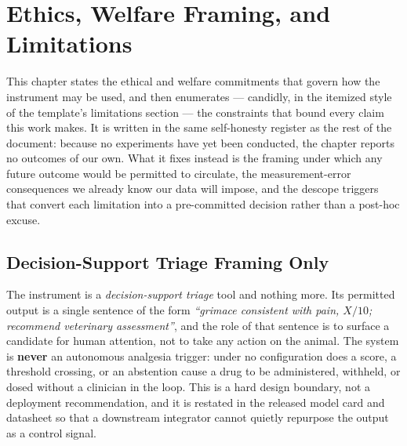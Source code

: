 
\chapter{Ethics, Welfare Framing, and Limitations}
\label{ch:ethics-welfare-limitations}

This chapter states the ethical and welfare commitments that govern how the
instrument may be used, and then enumerates --- candidly, in the itemized style
of the template's limitations section --- the constraints that bound every claim
this work makes. It is written in the same self-honesty register as the rest of
the document: because no experiments have yet been conducted, the chapter
reports no outcomes of our own. What it fixes instead is the framing under which
any future outcome would be permitted to circulate, the measurement-error
consequences we already know our data will impose, and the descope triggers that
convert each limitation into a pre-committed decision rather than a post-hoc
excuse.

\section{Decision-Support Triage Framing Only}
\label{sec:triage-framing}

The instrument is a \emph{decision-support triage} tool and nothing more. Its
permitted output is a single sentence of the form \emph{``grimace consistent
with pain, $X/10$; recommend veterinary assessment''}, and the role of that
sentence is to surface a candidate for human attention, not to take any action
on the animal. The system is \textbf{never} an autonomous analgesia trigger:
under no configuration does a score, a threshold crossing, or an abstention
cause a drug to be administered, withheld, or dosed without a clinician in the
loop. This is a hard design boundary, not a deployment recommendation, and it is
restated in the released model card and datasheet so that a downstream
integrator cannot quietly repurpose the output as a control signal.


